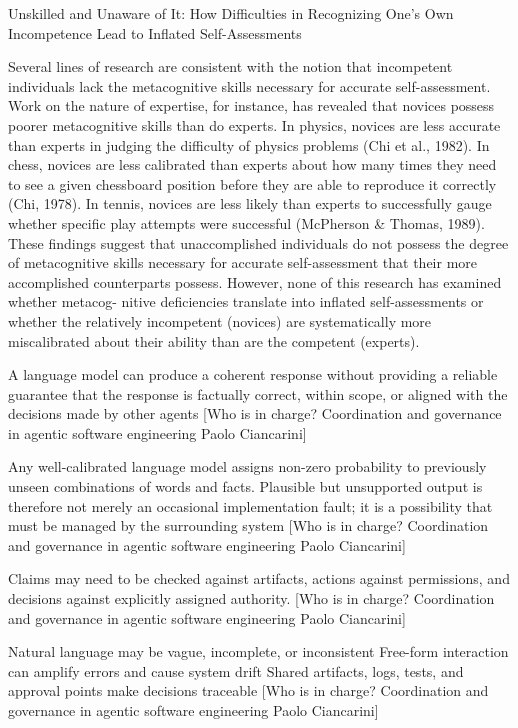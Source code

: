 Unskilled and Unaware of It: How Difficulties in Recognizing One's Own
Incompetence Lead to Inflated Self-Assessments

Several lines of research are consistent with the notion that
incompetent individuals lack the metacognitive skills necessary for
accurate self-assessment. Work on the nature of expertise, for
instance, has revealed that novices possess poorer metacognitive
skills than do experts. In physics, novices are less accurate than
experts in judging the difficulty of physics problems (Chi et al.,
1982). In chess, novices are less calibrated than experts about how
many times they need to see a given chessboard position before
they are able to reproduce it correctly (Chi, 1978). In tennis,
novices are less likely than experts to successfully gauge whether
specific play attempts were successful (McPherson & Thomas,
1989).
These findings suggest that unaccomplished individuals do not
possess the degree of metacognitive skills necessary for accurate
self-assessment that their more accomplished counterparts possess.
However, none of this research has examined whether metacog-
nitive deficiencies translate into inflated self-assessments or
whether the relatively incompetent (novices) are systematically
more miscalibrated about their ability than are the competent
(experts).


A language model can produce a coherent response without providing a reliable guarantee that the response is factually correct,
within scope, or aligned with the decisions made by other agents [Who is in charge? Coordination and governance in agentic
software engineering Paolo Ciancarini]

Any well-calibrated language model assigns
non-zero probability to previously unseen combinations of words and facts. Plausible but unsupported output is therefore not merely
an occasional implementation fault; it is a possibility that must be managed by the surrounding system [Who is in charge? Coordination and governance in agentic
software engineering Paolo Ciancarini]

Claims may need to be checked against artifacts, actions
against permissions, and decisions against explicitly assigned authority. [Who is in charge? Coordination and governance in agentic
software engineering Paolo Ciancarini]

Natural language may be vague, incomplete, or inconsistent
Free-form interaction can amplify errors and cause system drift
Shared artifacts, logs, tests, and approval points make decisions traceable [Who is in charge? Coordination and governance in agentic
software engineering Paolo Ciancarini]


